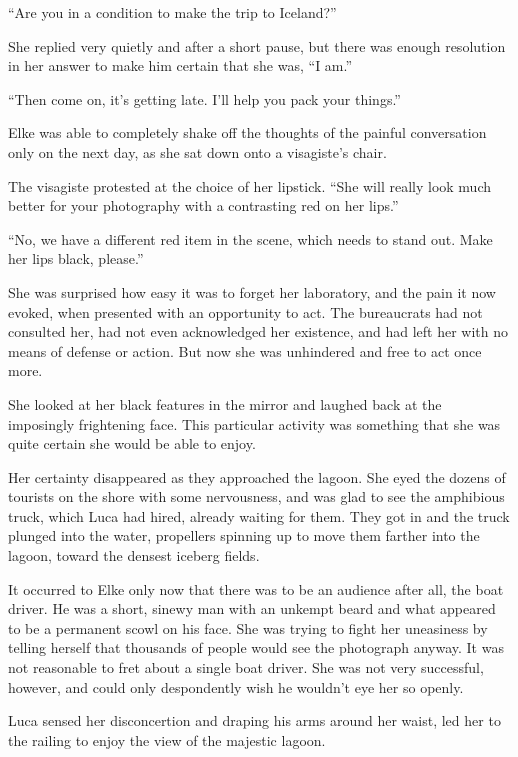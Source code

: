 ``Are you in a condition to make the trip to Iceland?''

She replied very quietly and after a short pause, but there was enough resolution in her answer to make him certain that she was, ``I am.''

``Then come on, it's getting late. I'll help you pack your things.''

\sectionline

Elke was able to completely shake off the thoughts of the painful conversation only on the next day, as she sat down onto a visagiste's chair.

The visagiste protested at the choice of her lipstick. ``She will really look much better for your photography with a contrasting red on her lips.''

``No, we have a different red item in the scene, which needs to stand out. Make her lips black, please.''

She was surprised how easy it was to forget her laboratory, and the pain it now evoked, when presented with an opportunity to act. The bureaucrats had not consulted her, had not even acknowledged her existence, and had left her with no means of defense or action. But now she was unhindered and free to act once more.

She looked at her black features in the mirror and laughed back at the imposingly frightening face. This particular activity was something that she was quite certain she would be able to enjoy.

\sectionline

Her certainty disappeared as they approached the lagoon. She eyed the dozens of tourists on the shore with some nervousness, and was glad to see the amphibious truck, which Luca had hired, already waiting for them. They got in and the truck plunged into the water, propellers spinning up to move them farther into the lagoon, toward the densest iceberg fields.

It occurred to Elke only now that there was to be an audience after all, the boat driver. He was a short, sinewy man with an unkempt beard and what appeared to be a permanent scowl on his face. She was trying to fight her uneasiness by telling herself that thousands of people would see the photograph anyway. It was not reasonable to fret about a single boat driver. She was not very successful, however, and could only despondently wish he wouldn't eye her so openly.

Luca sensed her disconcertion and draping his arms around her waist, led her to the railing to enjoy the view of the majestic lagoon.

